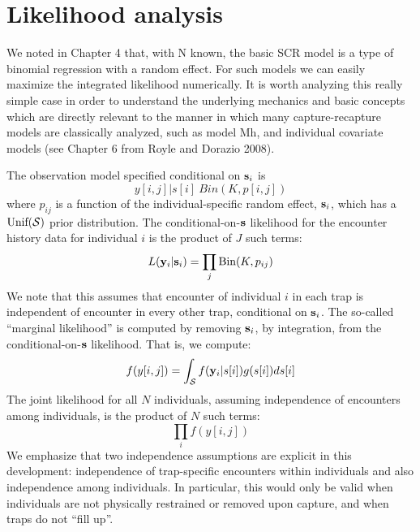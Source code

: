 \section{Likelihood analysis }

We noted in Chapter 4 that, with N known, the basic SCR model is a
type of binomial regression with a random effect. For such models we
can easily maximize the integrated likelihood numerically. It is worth
analyzing this really simple case in order to understand the
underlying mechanics and basic concepts which are directly relevant to
the manner in which many capture-recapture models are classically
analyzed, such as model Mh, and individual covariate models (see
Chapter 6 from Royle and Dorazio 2008).

The observation model specified conditional on ${\bf s}_{i}$ is 
\[
	y[i,j]|s[i] ~ Bin(K, p[i,j])
\]
where $p_{ij}$ is a function of the individual-specific random effect,
${\bf s}_{i}$, which has a $\mbox{Unif}({\cal S})$ prior distribution.  The
conditional-on-${\bf s}$ likelihood for the encounter history data for
individual $i$ is the product of $J$ such terms:
\[
      L( {\bold y}_{i} | {\bf s}_{i} ) =    \prod_{j} \mbox{Bin}(K, p_{ij})
\]
We note that this assumes that encounter of individual $i$ in each
trap is independent of encounter in every other trap, conditional on
${\bf s}_{i}$.  The so-called ``marginal likelihood'' is computed by removing
${\bf s}_{i}$, by integration, from the conditional-on-${\bf s}$ likelihood. That
is, we compute:
\[
          f(y[i,j]) = \int_{{\cal S}} f( {\bold y}_{i} |s[i]) g(s[i]) ds[i]
\]
The joint likelihood for all $N$ individuals, assuming independence of
encounters among individuals, is the product of $N$ such terms:
\[
          \prod_{i}  f(y[i,j])
\]
We emphasize that two independence assumptions are explicit in this
development: independence of trap-specific encounters within
individuals and also independence among individuals. In particular,
this would only be valid when individuals are not physically
restrained or removed upon capture, and when traps do not “fill up”.

